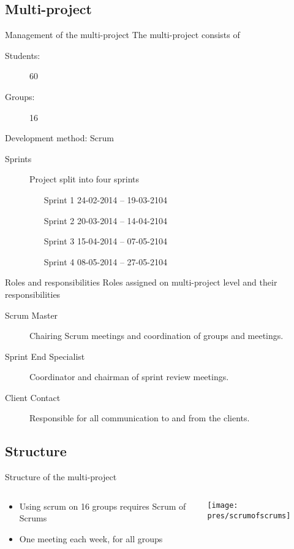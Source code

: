 \subsection{Multi-project}
\begin{frame}{Management of the multi-project}
	The multi-project consists of
	\begin{description}
		\item[Students:]{60}
		\item[Groups:]{16}
	\end{description}

	Development method: Scrum
	\begin{description}
		\item[Sprints]{Project split into four sprints}
		\begin{itemize}
			\item[Sprint 1] 24-02-2014 -- 19-03-2104 
			\item[Sprint 2] 20-03-2014 -- 14-04-2104
			\item[Sprint 3] 15-04-2014 -- 07-05-2104
			\item[Sprint 4] 08-05-2014 -- 27-05-2104
		\end{itemize}
	\end{description}
\end{frame}

\begin{frame}{Roles and responsibilities}
	Roles assigned on multi-project level and their responsibilities
	\begin{description}
		\item[Scrum Master] Chairing Scrum meetings and coordination of groups and meetings.
		\item[Sprint End Specialist] Coordinator and chairman of sprint review meetings.
		\item[Client Contact] Responsible for all communication to and from the clients.
	\end{description}
\end{frame}

\subsection{Structure}
\begin{frame}{Structure of the multi-project}
\begin{columns}
\begin{column}{.38\textwidth}
\begin{itemize}
\item Using scrum on 16 groups requires Scrum of Scrums
\item One meeting each week, for all groups
\end{itemize}
\end{column}
\begin{column}{.58\textwidth}
\texttt{[image: pres/scrumofscrums]}
\end{column}
\end{columns}
\end{frame}

